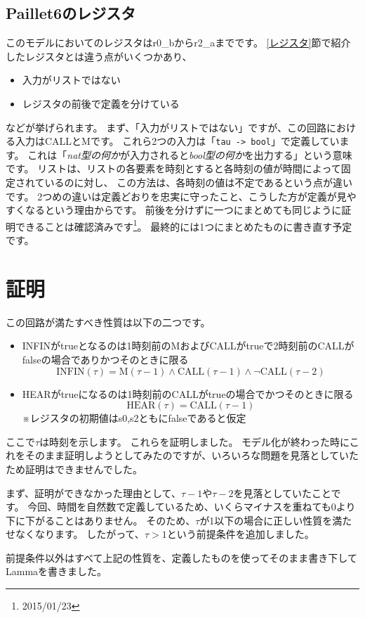\documentclass{jsbook}
\begin{document}
\subsection*{Paillet6のレジスタ}
このモデルにおいてのレジスタはr0\_bからr2\_aまでです。
\ref{レジスタ}節で紹介したレジスタとは違う点がいくつかあり、
\begin{itemize}
\item 入力がリストではない
\item レジスタの前後で定義を分けている
\end{itemize}
などが挙げられます。
まず、「入力がリストではない」ですが、この回路における入力はCALLとMです。
これら2つの入力は「\verb|tau -> bool|」で定義しています。
これは「\emph{nat型の何か}が入力されると\emph{bool型の何か}を出力する」という意味です。
リストは、リストの各要素を時刻とすると各時刻の値が時間によって固定されているのに対し、
この方法は、各時刻の値は不定であるという点が違いです。
2つめの違いは定義どおりを忠実に守ったこと、こうした方が定義が見やすくなるという理由からです。
前後を分けずに一つにまとめても同じように証明できることは確認済みです\footnote{2015/01/23}。
最終的には1つにまとめたものに書き直す予定です。

\section{証明}
この回路が満たすべき性質は以下の二つです。
\begin{itemize}
\item{INFINがtrueとなるのは1時刻前のMおよびCALLがtrueで2時刻前のCALLがfalseの場合でありかつそのときに限る}
$$\mbox{INFIN}(\tau)=\mbox{M}(\tau-1) \wedge \mbox{CALL}(\tau-1) \wedge \lnot \mbox{CALL}(\tau-2)$$
\item{HEARがtrueになるのは1時刻前のCALLがtrueの場合でかつそのときに限る}
$$\mbox{HEAR}(\tau) = \mbox{CALL}(\tau-1)$$
※レジスタの初期値はs0,s2ともにfalseであると仮定
\end{itemize}
ここで$\tau$は時刻を示します。
これらを証明しました。
モデル化が終わった時にこれをそのまま証明しようとしてみたのですが、いろいろな問題を見落としていたため証明はできませんでした。

まず、証明ができなかった理由として、$\tau-1$や$\tau-2$を見落としていたことです。
今回、時間を自然数で定義しているため、いくらマイナスを重ねても0より下に下がることはありません。
そのため、$\tau$が1以下の場合に正しい性質を満たせなくなります。
したがって、$\tau > 1$という前提条件を追加しました。

前提条件以外はすべて上記の性質を、定義したものを使ってそのまま書き下してLammaを書きました。
\end{document}
